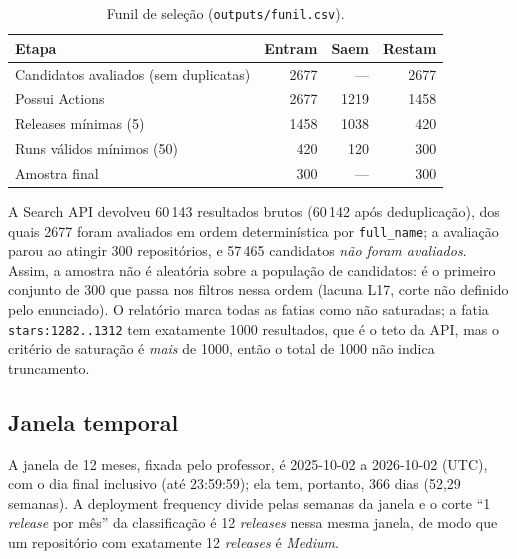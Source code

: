 \begin{table}[ht]
\centering
\caption{Funil de seleção (\texttt{outputs/funil.csv}).}
\begin{tabular}{lrrr}
\hline
Etapa & Entram & Saem & Restam \\ \hline
Candidatos avaliados (sem duplicatas) & 2677 & --- & 2677 \\
Possui Actions & 2677 & 1219 & 1458 \\
Releases mínimas (5) & 1458 & 1038 & 420 \\
Runs válidos mínimos (50) & 420 & 120 & 300 \\
Amostra final & 300 & --- & 300 \\ \hline
\end{tabular}
\end{table}

A Search API devolveu 60\,143 resultados brutos (60\,142 após deduplicação), dos quais 2677 foram
avaliados em ordem determinística por \texttt{full\_name}; a avaliação parou ao atingir 300 repositórios,
e 57\,465 candidatos \emph{não foram avaliados}. Assim, a amostra não é aleatória sobre a população de
candidatos: é o primeiro conjunto de 300 que passa nos filtros nessa ordem (lacuna L17, corte não definido
pelo enunciado). O relatório marca todas as fatias como não saturadas; a fatia \texttt{stars:1282..1312} tem
exatamente 1000 resultados, que é o teto da API, mas o critério de saturação é \emph{mais} de 1000,
então o total de 1000 não indica truncamento.

\subsection{Janela temporal}
A janela de 12 meses, fixada pelo professor, é 2025-10-02 a 2026-10-02 (UTC), com o dia final inclusivo
(até 23:59:59); ela tem, portanto, 366 dias (52,29 semanas). A deployment frequency divide pelas semanas
da janela e o corte ``1 \textit{release} por mês'' da classificação é 12 \textit{releases} nessa mesma
janela, de modo que um repositório com exatamente 12 \textit{releases} é \emph{Medium}.

